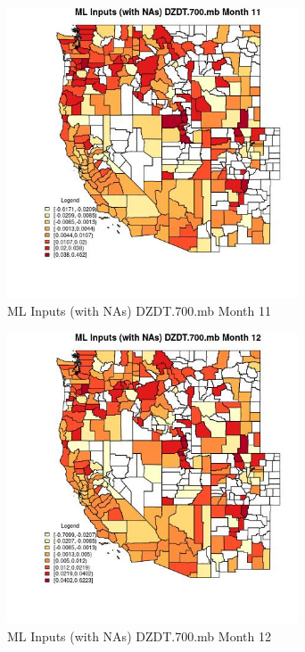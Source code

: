 \clearpage 

\begin{figure} 
\centering  
\includegraphics[width=0.77\textwidth]{Code_Outputs/Report_ML_input_PM25_Step4_part_e_de_duplicated_aves_compiled_2019-05-21wNAs_CountyDZDT700mbmedianMonth11.jpg} 
\caption{\label{fig:Report_ML_input_PM25_Step4_part_e_de_duplicated_aves_compiled_2019-05-21wNAsCountyDZDT700mbmedianMonth11}ML Inputs (with NAs) DZDT.700.mb Month 11} 
\end{figure} 
 

\begin{figure} 
\centering  
\includegraphics[width=0.77\textwidth]{Code_Outputs/Report_ML_input_PM25_Step4_part_e_de_duplicated_aves_compiled_2019-05-21wNAs_CountyDZDT700mbmedianMonth12.jpg} 
\caption{\label{fig:Report_ML_input_PM25_Step4_part_e_de_duplicated_aves_compiled_2019-05-21wNAsCountyDZDT700mbmedianMonth12}ML Inputs (with NAs) DZDT.700.mb Month 12} 
\end{figure} 
 

